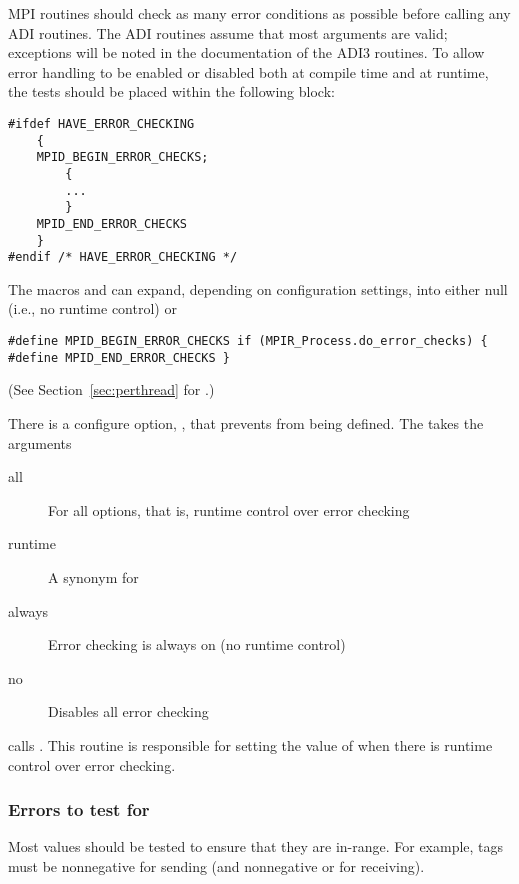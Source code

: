 \documentclass{article}
\begin{document}
MPI routines should check as many error conditions as possible before
calling any ADI routines.  The ADI routines assume that most arguments are
valid; exceptions will be noted in the documentation of the ADI3 routines.
To allow error handling to be enabled or disabled both at compile
time 
and at runtime, the tests should be placed within the following block:
\begin{verbatim}
#ifdef HAVE_ERROR_CHECKING
    {
    MPID_BEGIN_ERROR_CHECKS;
        {
        ...
        }
    MPID_END_ERROR_CHECKS
    }
#endif /* HAVE_ERROR_CHECKING */
\end{verbatim}
The macros  and  can
expand, depending on configuration settings, into either null (i.e.,
no runtime control) or 
\begin{verbatim}
#define MPID_BEGIN_ERROR_CHECKS if (MPIR_Process.do_error_checks) {
#define MPID_END_ERROR_CHECKS }
\end{verbatim}
(See Section~\ref{sec:perthread} for .)

There is a configure option,
,  
that prevents  from being defined.  The
takes the arguments
\begin{description}
\item[all]For all options, that is, runtime control over error checking
\item[runtime]A synonym for 
\item[always]Error checking is always on (no runtime control)
\item[no]Disables all error checking
\end{description}

 calls .  This
routine is responsible for setting the value of
 when there is runtime control over
error checking.


\subsubsection{Errors to test for}
Most values should be tested to ensure that they are in-range.  For example,
tags must be nonnegative for sending (and nonnegative or
 for receiving). 
\end{document}
